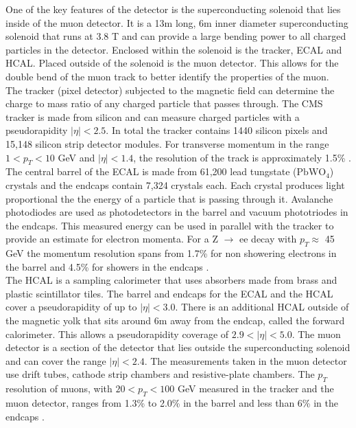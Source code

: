 One of the key features of the detector is the superconducting solenoid that lies inside of the muon detector. It is a 13m long, 6m inner diameter superconducting solenoid that runs at 3.8 T and can provide a large bending power to all charged particles in the detector. Enclosed within the solenoid is the tracker, ECAL and HCAL. Placed outside of the solenoid is the muon detector. This allows for the double bend of the muon track to better identify the properties of the muon. \\

The tracker (pixel detector) subjected to the magnetic field can determine the charge to mass ratio of any charged particle that passes through. The CMS tracker is made from silicon and can measure charged particles with a pseudorapidity \(|\eta|<2.5\). In total the tracker contains 1440 silicon pixels and 15,148 silicon strip detector modules. For transverse momentum in the range \(1<p_{T}<10\) GeV and \(|\eta|<1.4\), the resolution of the track is approximately 1.5\% \cite{CMS_MSSM_Tau_2018}. The central barrel of the ECAL is made from 61,200 lead tungstate (\(\text{PbWO}_4\)) crystals and the endcaps contain 7,324 crystals each. Each crystal produces light proportional the the energy of a particle that is passing through it. Avalanche photodiodes are used as photodetectors in the barrel and vacuum phototriodes in the endcaps. This measured energy can be used in parallel with the tracker to provide an estimate for electron momenta. For a Z \(\rightarrow\) ee decay with \(p_T \approx\) 45 GeV the momentum resolution spans from 1.7\% for non showering electrons in the barrel and 4.5\% for showers in the endcaps \cite{electron_performance}. \\

The HCAL is a sampling calorimeter that uses absorbers made from brass and plastic scintillator tiles. The barrel and endcaps for the ECAL and the HCAL cover a pseudorapidity of up to \(|\eta|<3.0\). There is an additional HCAL outside of the magnetic yolk that sits around 6m away from the endcap, called the forward calorimeter. This allows a pseudorapidity coverage of \(2.9 < |\eta| < 5.0\). The muon detector is a section of the detector that lies outside the superconducting solenoid and can cover the range \(|\eta|<2.4\). The measurements taken in the muon detector use drift tubes, cathode strip chambers and resistive-plate chambers. The \(p_T\) resolution of muons, with \(20 < p_T < 100\) GeV measured in the tracker and the muon detector, ranges from 1.3\% to 2.0\% in the barrel and less than 6\% in the endcaps \cite{CMS_muon}.  \\

